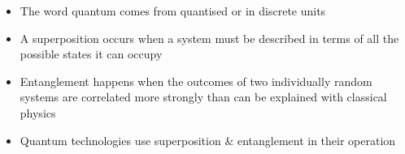 \begin{itemize}

    \item The word quantum comes from quantised or in discrete units 
    \item A superposition occurs when a system must be described in terms of all the possible states it can occupy
    \item Entanglement happens when the outcomes of two individually random systems are correlated more strongly than can be explained with classical physics 
    \item Quantum technologies use superposition \& entanglement in their operation 
    
\end{itemize}